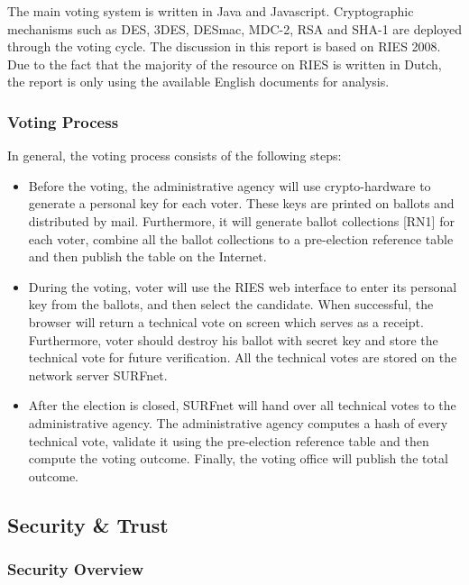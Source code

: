 The main voting system is written in Java and
Javascript. Cryptographic mechanisms such as DES, 3DES, DESmac, MDC-2,
RSA and SHA-1 are deployed through the voting cycle. The discussion in
this report is based on RIES 2008. Due to the fact that the majority
of the resource on RIES is written in Dutch, the report is only using
the available English documents for analysis.

\subsubsection{Voting Process}

In general, the voting process consists of the following steps:

\begin{itemize}
\item Before the voting, the administrative agency will use
  crypto-hardware to generate a personal key for each voter. These
  keys are printed on ballots and distributed by mail. Furthermore, it
  will generate ballot collections [RN1] for each voter, combine all
  the ballot collections to a pre-election reference table and then
  publish the table on the Internet.
\item During the voting, voter will use the RIES web interface to
  enter its personal key from the ballots, and then select the
  candidate. When successful, the browser will return a technical vote
  on screen which serves as a receipt. Furthermore, voter should
  destroy his ballot with secret key and store the technical vote for
  future verification. All the technical votes are stored on the
  network server SURFnet.
\item After the election is closed, SURFnet will hand over all
  technical votes to the administrative agency. The administrative
  agency computes a hash of every technical vote, validate it using
  the pre-election reference table and then compute the voting
  outcome. Finally, the voting office will publish the total outcome.
\end{itemize}

\subsection{Security \& Trust}

\subsubsection{Security Overview}

